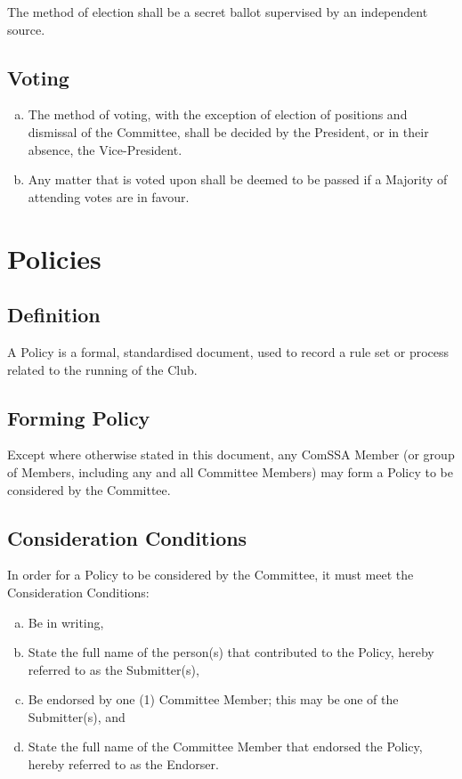 \documentclass[a4paper,12pt]{article}
\begin{document}
The method of election shall be a secret ballot supervised by an independent source.

\subsection{Voting}

\begin{enumerate}[a)]
	\item The method of voting, with the exception of election of positions and dismissal of the Committee, shall be decided by the President, or in their absence, the Vice-President.
	\item Any matter that is voted upon shall be deemed to be passed if a Majority of attending votes are in favour.
\end{enumerate}

\section{Policies}

\subsection{Definition}

A Policy is a formal, standardised document, used to record a rule set or process related to the running of the Club.

\subsection{Forming Policy}

Except where otherwise stated in this document, any ComSSA Member (or group of Members, including any and all Committee Members) may form a Policy to be considered by the Committee.

\subsection{Consideration Conditions}

In order for a Policy to be considered by the Committee, it must meet the Consideration Conditions:

\begin{enumerate}[a)]
	\item Be in writing,
	\item State the full name of the person(s) that contributed to the Policy, hereby referred to as the Submitter(s),
	\item Be endorsed by one (1) Committee Member; this may be one of the Submitter(s), and
	\item State the full name of the Committee Member that endorsed the Policy, hereby referred to as the Endorser.
\end{enumerate}
\end{document}
